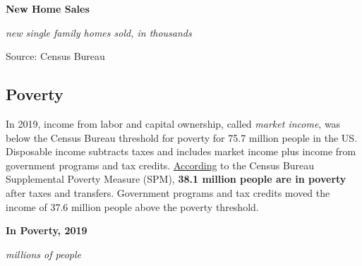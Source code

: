 \documentclass{report}
\makeatletter
\newcommand{\tbllink}[1]{\href{https://raw.githubusercontent.com/bdecon/US-chartbook/master/chartbook/data/#1}{\faTable}}
\newcommand*\short[1]{\expandafter\@gobbletwo\number\numexpr#1\relax}
\newcommand{\dateaxisticks}{
		date coordinates in=x, axis line style={draw=none},
		xmax={2020-10-01},
		max space between ticks=40,	    
		xtick={{1990-01-01}, {1992-01-01}, {1994-01-01}, 
			{1996-01-01}, {1998-01-01}, {2000-01-01}, 
			{2002-01-01}, {2004-01-01}, {2006-01-01},
			{2008-01-01}, {2010-01-01}, {2012-01-01}, {2014-01-01},
		    {2016-01-01}, {2018-01-01}, {2020-01-01}},
		minor xtick={{1989-01-01}, {1991-01-01}, {1993-01-01},
			{1995-01-01}, {1997-01-01}, {1999-01-01}, 
			{2001-01-01}, {2003-01-01}, {2005-01-01}, {2007-01-01},
		    {2009-01-01}, {2011-01-01}, {2013-01-01}, {2015-01-01},
		    {2017-01-01}, {2019-01-01}},
		enlarge y limits={0.06}, enlarge x limits={0.01},
		}
\newcommand{\bbar}[2]{extra #1 ticks = {{#2}}, extra #1 tick labels = ,
		extra #1 tick style = {grid=major, grid style={thick, black!25}},}
\newcommand{\stdline}[4]{\addplot[very thick, no markers, color=#1] 
		table [x=#2, y=#3, col sep=comma] {#4};	}
\newcommand{\rbars}{
		\fill[color=black!10] (axis cs:{1990-07-01},\pgfkeysvalueof{/pgfplots/ymin}) rectangle 
			(axis cs:{1991-03-01}, \pgfkeysvalueof{/pgfplots/ymax});
		\fill[color=black!10] (axis cs:{2007-12-01},\pgfkeysvalueof{/pgfplots/ymin}) rectangle 
			(axis cs:{2009-07-01}, \pgfkeysvalueof{/pgfplots/ymax});
		\fill[color=black!10] (axis cs:{2001-03-01},\pgfkeysvalueof{/pgfplots/ymin}) rectangle 
			(axis cs:{2001-11-01}, \pgfkeysvalueof{/pgfplots/ymax});
		\fill[color=black!10] (axis cs:{2020-02-01},\pgfkeysvalueof{/pgfplots/ymin}) rectangle 
			(axis cs:{2020-10-01}, \pgfkeysvalueof{/pgfplots/ymax});}
\makeatother
\begin{document}
{{{\begin{minipage}{0.76\textwidth}
\vspace{7mm}

\small 

\vspace{3mm}

\normalsize{\textbf{New Home Sales}}

\footnotesize{\textit{new single family homes sold, in thousands}}

\hspace*{-2mm} 

\footnotesize{Source: Census Bureau} \hfill \tbllink{nhs.csv}

\end{minipage}

\newpage
\subsection*{\color{black!70} \seriffont Poverty}
\begin{minipage}{0.46\textwidth}
\small
In 2019, income from labor and capital ownership, called \textit{market income}, was below the Census Bureau threshold for poverty for 75.7 million people in the US. Disposable income subtracts taxes and includes market income plus income from government programs and tax credits. \href{https://www.census.gov/library/publications/2019/demo/p60-268.html}{According} to the Census Bureau Supplemental Poverty Measure (SPM), \textbf{38.1 million people are in poverty} after taxes and transfers. Government programs and tax credits moved the income of 37.6 million people above the poverty threshold.
\end{minipage} \hspace{6mm}
\begin{minipage}{0.22\textwidth}
\normalsize \textbf{In Poverty, 2019}

\footnotesize{\textit{millions of people}}
 

\end{minipage}}}}
\end{document}
